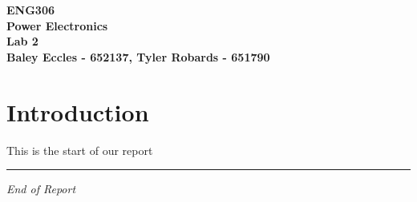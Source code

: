 \documentclass[12pt,a4paper]{article}
\begin{document}
\begin{center}
\textbf{\LARGE ENG306\\[6pt]
Power Electronics}\\[10pt]
\textbf{\large Lab 2\\[4pt]
Baley Eccles - 652137, Tyler Robards - 651790}\\
\end{center}

\section{Introduction}
This is the start of our report
\vfill
\hrule
\begin{center}
\textit{End of Report}
\end{center}
\end{document}

